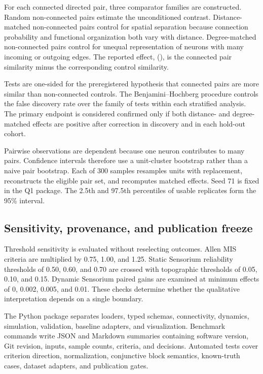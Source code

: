 For each connected directed pair, three comparator families are constructed.
Random non-connected pairs estimate the unconditioned contrast. Distance-matched
non-connected pairs control for spatial separation because connection
probability and functional organization both vary with distance. Degree-matched
non-connected pairs control for unequal representation of neurons with many
incoming or outgoing edges. The reported effect, (\Delta), is the connected
pair similarity minus the corresponding control similarity.

Tests are one-sided for the preregistered hypothesis that connected pairs are
more similar than non-connected controls. The Benjamini--Hochberg procedure
controls the false discovery rate over the family of tests within each
stratified analysis. The primary endpoint is considered confirmed only if both
distance- and degree-matched effects are positive after correction in discovery
and in each hold-out cohort.

Pairwise observations are dependent because one neuron contributes to many
pairs. Confidence intervals therefore use a unit-cluster bootstrap rather than
a naive pair bootstrap. Each of 300 samples resamples units with replacement,
reconstructs the eligible pair set, and recomputes matched effects. Seed 71 is
fixed in the Q1 package. The 2.5th and 97.5th percentiles of usable replicates
form the 95\% interval.

\subsection{Sensitivity, provenance, and publication freeze}

Threshold sensitivity is evaluated without reselecting outcomes. Allen MIS
criteria are multiplied by 0.75, 1.00, and 1.25. Static Sensorium reliability
thresholds of 0.50, 0.60, and 0.70 are crossed with topographic thresholds of
0.05, 0.10, and 0.15. Dynamic Sensorium paired gains are examined at minimum
effects of 0, 0.002, 0.005, and 0.01. These checks determine whether the
qualitative interpretation depends on a single boundary.

The Python package separates loaders, typed schemas, connectivity, dynamics,
simulation, validation, baseline adapters, and visualization. Benchmark commands
write JSON and Markdown summaries containing software version, Git revision,
inputs, sample counts, criteria, and decisions. Automated tests cover criterion
direction, normalization, conjunctive block semantics, known-truth cases,
dataset adapters, and publication gates.

